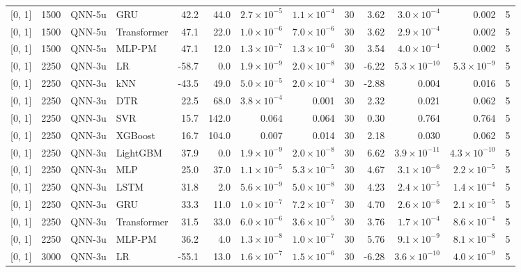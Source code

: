 \begin{longtable}{lrllrrrrrrrrr}
{[0, 1]} & 1500 & QNN-5u & GRU & 42.2 & 44.0 & $2.7 \times 10^{-5}$ & $1.1 \times 10^{-4}$ & 30 & 3.62 & $3.0 \times 10^{-4}$ & 0.002 & 5 \\
{[0, 1]} & 1500 & QNN-5u & Transformer & 47.1 & 22.0 & $1.0 \times 10^{-6}$ & $7.0 \times 10^{-6}$ & 30 & 3.62 & $2.9 \times 10^{-4}$ & 0.002 & 5 \\
{[0, 1]} & 1500 & QNN-5u & MLP-PM & 47.1 & 12.0 & $1.3 \times 10^{-7}$ & $1.3 \times 10^{-6}$ & 30 & 3.54 & $4.0 \times 10^{-4}$ & 0.002 & 5 \\
\midrule
{[0, 1]} & 2250 & QNN-3u & LR & -58.7 & 0.0 & $1.9 \times 10^{-9}$ & $2.0 \times 10^{-8}$ & 30 & -6.22 & $5.3 \times 10^{-10}$ & $5.3 \times 10^{-9}$ & 5 \\
{[0, 1]} & 2250 & QNN-3u & kNN & -43.5 & 49.0 & $5.0 \times 10^{-5}$ & $2.0 \times 10^{-4}$ & 30 & -2.88 & 0.004 & 0.016 & 5 \\
{[0, 1]} & 2250 & QNN-3u & DTR & 22.5 & 68.0 & $3.8 \times 10^{-4}$ & 0.001 & 30 & 2.32 & 0.021 & 0.062 & 5 \\
{[0, 1]} & 2250 & QNN-3u & SVR & 15.7 & 142.0 & 0.064 & 0.064 & 30 & 0.30 & 0.764 & 0.764 & 5 \\
{[0, 1]} & 2250 & QNN-3u & XGBoost & 16.7 & 104.0 & 0.007 & 0.014 & 30 & 2.18 & 0.030 & 0.062 & 5 \\
{[0, 1]} & 2250 & QNN-3u & LightGBM & 37.9 & 0.0 & $1.9 \times 10^{-9}$ & $2.0 \times 10^{-8}$ & 30 & 6.62 & $3.9 \times 10^{-11}$ & $4.3 \times 10^{-10}$ & 5 \\
{[0, 1]} & 2250 & QNN-3u & MLP & 25.0 & 37.0 & $1.1 \times 10^{-5}$ & $5.3 \times 10^{-5}$ & 30 & 4.67 & $3.1 \times 10^{-6}$ & $2.2 \times 10^{-5}$ & 5 \\
{[0, 1]} & 2250 & QNN-3u & LSTM & 31.8 & 2.0 & $5.6 \times 10^{-9}$ & $5.0 \times 10^{-8}$ & 30 & 4.23 & $2.4 \times 10^{-5}$ & $1.4 \times 10^{-4}$ & 5 \\
{[0, 1]} & 2250 & QNN-3u & GRU & 33.3 & 11.0 & $1.0 \times 10^{-7}$ & $7.2 \times 10^{-7}$ & 30 & 4.70 & $2.6 \times 10^{-6}$ & $2.1 \times 10^{-5}$ & 5 \\
{[0, 1]} & 2250 & QNN-3u & Transformer & 31.5 & 33.0 & $6.0 \times 10^{-6}$ & $3.6 \times 10^{-5}$ & 30 & 3.76 & $1.7 \times 10^{-4}$ & $8.6 \times 10^{-4}$ & 5 \\
{[0, 1]} & 2250 & QNN-3u & MLP-PM & 36.2 & 4.0 & $1.3 \times 10^{-8}$ & $1.0 \times 10^{-7}$ & 30 & 5.76 & $9.1 \times 10^{-9}$ & $8.1 \times 10^{-8}$ & 5 \\
\midrule
{[0, 1]} & 3000 & QNN-3u & LR & -55.1 & 13.0 & $1.6 \times 10^{-7}$ & $1.5 \times 10^{-6}$ & 30 & -6.28 & $3.6 \times 10^{-10}$ & $4.0 \times 10^{-9}$ & 5 \\

\end{longtable}
